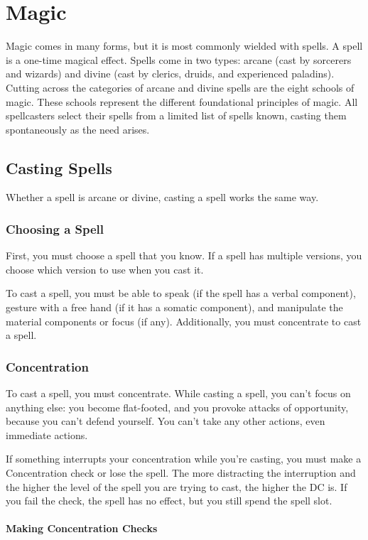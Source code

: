 \chapter{Magic}\label{Magic}
Magic comes in many forms, but it is most commonly wielded with spells. A spell is a one-time magical effect. Spells come in two types: arcane (cast by sorcerers and wizards) and divine (cast by clerics, druids, and experienced paladins). Cutting across the categories of arcane and divine spells are the eight schools of magic. These schools represent the different foundational principles of magic. All spellcasters select their spells from a limited list of spells known, casting them spontaneously as the need arises.

\section{Casting Spells}\label{Casting Spells}
Whether a spell is arcane or divine, casting a spell works the same way.

\subsection{Choosing a Spell}
First, you must choose a spell that you know. If a spell has multiple versions, you choose which version to use when you cast it.

To cast a spell, you must be able to speak (if the spell has a verbal component), gesture with a free hand (if it has a somatic component), and manipulate the material components or focus (if any). Additionally, you must concentrate to cast a spell.

\subsection{Concentration}
To cast a spell, you must concentrate. While casting a spell, you can't focus on anything else: you become flat-footed, and you provoke attacks of opportunity, because you can't defend yourself. You can't take any other actions, even immediate actions.

If something interrupts your concentration while you're casting, you must make a Concentration check or lose the spell. The more distracting the interruption and the higher the level of the spell you are trying to cast, the higher the DC is. If you fail the check, the spell has no effect, but you still spend the spell slot.

\subsubsection{Making Concentration Checks}

